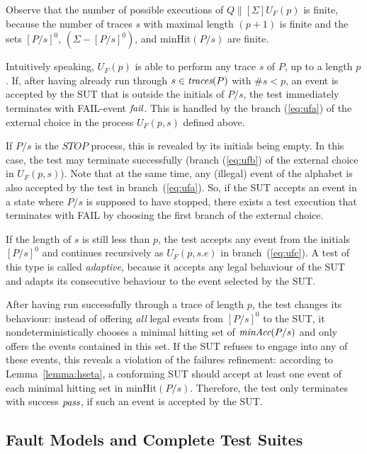 Observe that the number of possible executions of $Q\parallel[\Sigma] U_F(p)$ is finite,
because the number of traces $s$ with maximal length $(p+1)$ is finite and the 
sets $[P/s]^0$, $(\Sigma - [P/s]^0)$, and $\text{minHit}(P/s)$ are finite.

Intuitively speaking, $U_F(p)$ is able to perform any trace $s$ of $P$, up to
a length $p$. If, after having already run through $s\in\text{\it traces}(P)$ with $\#s <
p$, an event is accepted by the SUT that is outside the initials of $P/s$,
the test immediately terminates with FAIL-event ${\text{\it fail}}$. This is handled by
the branch (\ref{eq:ufa}) of the external choice in the process $U_F(p,s)$
defined above.

If $P/s$ is the $STOP$ process, this is revealed by its initials being empty.
In this case, the test may terminate successfully (branch (\ref{eq:ufb}) of
the external choice in $U_F(p,s)$). Note that at the same time, any (illegal)
event of the alphabet is also accepted by the test in branch~(\ref{eq:ufa}).
So, if the SUT accepts an event in a state where $P/s$ is supposed to have
stopped, there exists a test execution that terminates with FAIL by choosing
the first branch of the external choice.

If the length of $s$ is still less than $p$, the test accepts any event from
the initials $[P/s]^0$ and continues recursively as $U_F(p,s.e)$ in
branch~(\ref{eq:ufc}). A test of this type is called \emph{adaptive}, because
it accepts any legal behaviour of the SUT and adapts its consecutive
behaviour to the event selected by the SUT.

After having  run successfully
through a trace of length $p$, the test changes its behaviour:
instead of offering {\it all} legal events from $[P/s]^0$ to the SUT,
it nondeterministically chooses
a minimal hitting set of $\text{\it minAcc}(P/s)$ and only offers the events contained in this set.
If the SUT refuses to engage into any of these events, this reveals a violation of the
failures refinement: according to Lemma~\ref{lemma:hseta}, a conforming SUT should accept
at least one event of each minimal hitting set in $\text{minHit}(P/s)$. Therefore, the test
only terminates with success ${\text{\it pass}}$, if such an event is accepted by the SUT.



\subsection{Fault Models and Complete Test Suites}

